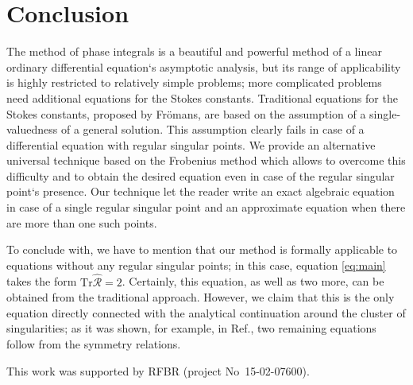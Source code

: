 \documentclass[aip,jmp,reprint]{revtex4-1}
\def\R{\widehat{\mathcal{R}}}
\def\Tr{\mathrm{Tr}}
\begin{document}
\section{Conclusion \label{sec:con}}
The method of phase integrals is a beautiful and powerful method of a linear ordinary 
differential equation`s asymptotic analysis, but its range of applicability is highly 
restricted to relatively simple problems; more complicated problems need additional equations 
for the Stokes constants. Traditional equations for the Stokes constants, proposed by Fr\"omans\cite{frpaper},
are based on the assumption of a single-valuedness of a general solution. This assumption clearly fails
in case of a differential equation with regular singular points. We provide an alternative universal
technique based on the Frobenius method which allows to overcome this difficulty and to obtain the 
desired equation even in case of the regular singular point`s presence. 
Our technique let the reader write an exact algebraic equation in case
of a single regular singular point and an approximate equation when there are more than one such points.

To conclude with, we have to mention that our method is formally applicable to equations without any regular
singular points; in this case, equation \eqref{eq:main} takes the form $\Tr \R = 2$. Certainly, this equation,
as well as two more, can be obtained from the traditional approach. However, we claim that this is the only equation
directly connected with the analytical continuation around the cluster of singularities; as it was shown,
for example, in Ref., two remaining equations follow from the symmetry relations.

\begin{acknowledgments}
This work was supported by RFBR (project No~15-02-07600).
\end{acknowledgments}
\end{document}
